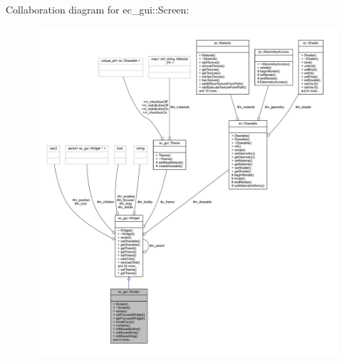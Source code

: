 Collaboration diagram for ec\+\_\+gui\+:\+:Screen\+:\nopagebreak
\begin{figure}[H]
\begin{center}
\leavevmode
\includegraphics[width=350pt]{classec__gui_1_1_screen__coll__graph}
\end{center}
\end{figure}
